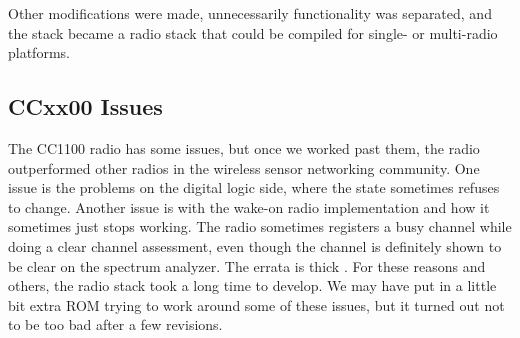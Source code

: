 \documentclass{article}
\begin{document}
Other modifications were made, unnecessarily functionality was separated, and the stack became a radio
stack that could be compiled for single- or multi-radio platforms.

\subsection{CCxx00 Issues}
The CC1100 radio has some issues, but once we worked past them, the radio outperformed other radios 
in the wireless sensor networking community.  One issue is the problems on the digital logic side, where
the state sometimes refuses to change. Another issue is with the wake-on radio implementation and how
it sometimes just stops working.  The radio sometimes registers a busy channel while doing a clear
channel assessment, even though the channel is definitely shown to be clear on the spectrum analyzer.
The errata is thick \cite{cc1101errata}.  For these reasons and others, the radio stack took a long time to develop.  
We may have put in a little bit extra ROM trying to work around some of these issues, but 
it turned out not to be too bad after a few revisions.




		
\end{document}
